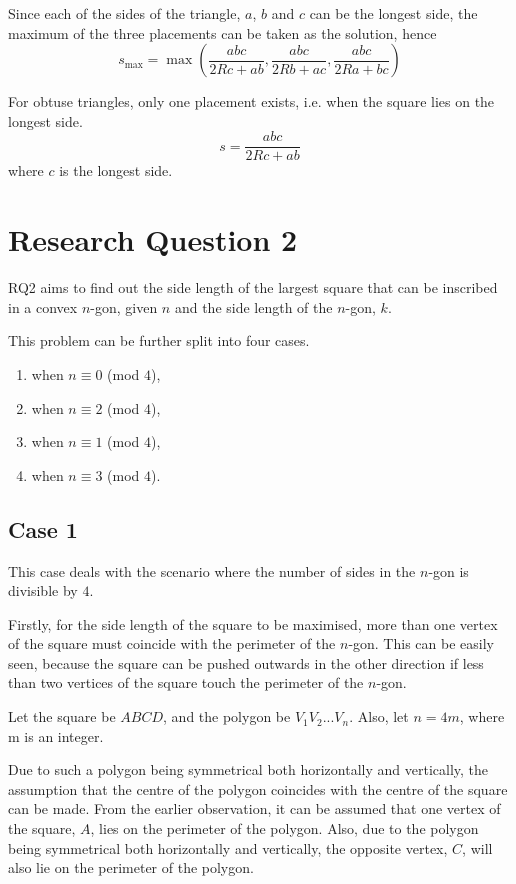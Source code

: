 \documentclass[12pt]{scrartcl}
\begin{document}
Since each of the sides of the triangle, $a$, $b$ and $c$ can be the longest side,
the maximum of the three placements can be taken as the solution, hence
\begin{equation}
	s_{\text{max}} = \max\left(\dfrac{abc}{2Rc+ab},\dfrac{abc}{2Rb+ac},\dfrac{abc}{2Ra+bc}\right)
\end{equation}

For obtuse triangles, only one placement exists, i.e. when the square lies on the longest side.
\begin{equation}
	s = \dfrac{abc}{2Rc+ab}
\end{equation}
where $c$ is the longest side.

\section{Research Question 2}

RQ2 aims to find out the side length of the largest square that can be inscribed in a convex $n$-gon,
given $n$ and the side length of the $n$-gon, $k$.

This problem can be further split into four cases.
\begin{enumerate}
	\item when \(n \equiv 0\) (mod $4$),
	\item when \(n \equiv 2\) (mod $4$),
	\item when \(n \equiv 1\) (mod $4$),
	\item when \(n \equiv 3\) (mod $4$). 
\end{enumerate}

\subsection{Case 1}
This case deals with the scenario where the number of sides in the $n$-gon is divisible by $4$.

Firstly, for the side length of the square to be maximised, more than one vertex of the square must coincide with the perimeter of the $n$-gon.
This can be easily seen, because the square can be pushed outwards in the other direction if less than two vertices of the square touch the perimeter of the $n$-gon.

Let the square be $ABCD$, and the polygon be $V_{1}V_{2}...V_{n}$. Also, let \(n = 4m\), where m is an integer.

Due to such a polygon being symmetrical both horizontally and vertically, the assumption that the centre of the polygon coincides with the centre of the square can be made. From the earlier observation, it can be assumed that one vertex of the square, $A$, lies on the perimeter of the polygon. Also, due to the polygon being symmetrical both horizontally and vertically, the opposite vertex, $C$, will also lie on the perimeter of the polygon.
\end{document}
